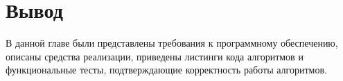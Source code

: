 \section*{Вывод}

В данной главе были представлены требования к программному обеспечению, описаны средства реализации, приведены листинги кода алгоритмов и функциональные тесты, подтверждающие корректность работы алгоритмов.
